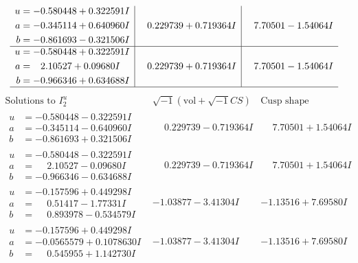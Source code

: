 \documentclass[1p]{elsarticle_modified}
\theoremstyle{definition}
\newcommand{\I}{\sqrt{-1}}
\begin{document}
$$\begin{array}{c|c|c}
\begin{aligned}
u &= -0.580448 + 0.322591 I \\
a &= -0.345114 + 0.640960 I \\
b &= -0.861693 - 0.321506 I\end{aligned}
 & \phantom{-}0.229739 + 0.719364 I & \phantom{-}7.70501 - 1.54064 I \\ \hline\begin{aligned}
u &= -0.580448 + 0.322591 I \\
a &= \phantom{-}2.10527 + 0.09680 I \\
b &= -0.966346 + 0.634688 I\end{aligned}
 & \phantom{-}0.229739 + 0.719364 I & \phantom{-}7.70501 - 1.54064 I\\
 \hline 
 \end{array}$$\newpage$$\begin{array}{c|c|c}  
\text{Solutions to }I^u_{2}& \I (\text{vol} + \sqrt{-1}CS) & \text{Cusp shape}\\
 \hline 
\begin{aligned}
u &= -0.580448 - 0.322591 I \\
a &= -0.345114 - 0.640960 I \\
b &= -0.861693 + 0.321506 I\end{aligned}
 & \phantom{-}0.229739 - 0.719364 I & \phantom{-}7.70501 + 1.54064 I \\ \hline\begin{aligned}
u &= -0.580448 - 0.322591 I \\
a &= \phantom{-}2.10527 - 0.09680 I \\
b &= -0.966346 - 0.634688 I\end{aligned}
 & \phantom{-}0.229739 - 0.719364 I & \phantom{-}7.70501 + 1.54064 I \\ \hline\begin{aligned}
u &= -0.157596 + 0.449298 I \\
a &= \phantom{-}0.51417 - 1.77331 I \\
b &= \phantom{-}0.893978 - 0.534579 I\end{aligned}
 & -1.03877 - 3.41304 I & -1.13516 + 7.69580 I \\ \hline\begin{aligned}
u &= -0.157596 + 0.449298 I \\
a &= -0.0565579 + 0.1078630 I \\
b &= \phantom{-}0.545955 + 1.142730 I\end{aligned}
 & -1.03877 - 3.41304 I & -1.13516 + 7.69580 I \\ \hline\begin{aligned}

\end{aligned}
\end{array}$$
\end{document}
